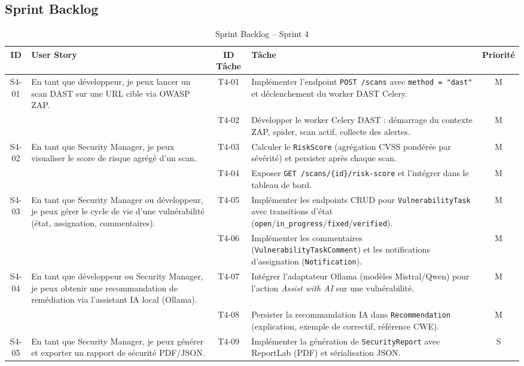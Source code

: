 \subsection{Sprint Backlog}
\begin{table}[H]
\centering
\caption{Sprint Backlog -- Sprint 4}
\label{tab:sprint4-backlog}
\small
\renewcommand{\arraystretch}{1.3}
\begin{tabularx}{\textwidth}{c X c X c}
\hline
\rowcolor{gray!15}
\textbf{ID} & \textbf{User Story} & \textbf{ID Tâche} & \textbf{Tâche} & \textbf{Priorité} \\
\hline
S4-01 & En tant que développeur, je peux lancer un scan DAST sur une URL cible via OWASP ZAP.
  & T4-01 & Implémenter l'endpoint \texttt{POST /scans} avec \texttt{method = "dast"} et déclenchement du worker DAST Celery. & M \\
\cline{3-5}
  & & T4-02 & Développer le worker Celery DAST : démarrage du contexte ZAP, spider, scan actif, collecte des alertes. & M \\
\hline
S4-02 & En tant que Security Manager, je peux visualiser le score de risque agrégé d'un scan.
  & T4-03 & Calculer le \texttt{RiskScore} (agrégation CVSS pondérée par sévérité) et persister après chaque scan. & M \\
\cline{3-5}
  & & T4-04 & Exposer \texttt{GET /scans/\{id\}/risk-score} et l'intégrer dans le tableau de bord. & M \\
\hline
S4-03 & En tant que Security Manager ou développeur, je peux gérer le cycle de vie d'une vulnérabilité (état, assignation, commentaires).
  & T4-05 & Implémenter les endpoints CRUD pour \texttt{VulnerabilityTask} avec transitions d'état (\texttt{open}/\texttt{in\_progress}/\texttt{fixed}/\texttt{verified}). & M \\
\cline{3-5}
  & & T4-06 & Implémenter les commentaires (\texttt{VulnerabilityTaskComment}) et les notifications d'assignation (\texttt{Notification}). & M \\
\hline
S4-04 & En tant que développeur ou Security Manager, je peux obtenir une recommandation de remédiation via l'assistant IA local (Ollama).
  & T4-07 & Intégrer l'adaptateur Ollama (modèles Mistral/Qwen) pour l'action \textit{Assist with AI} sur une vulnérabilité. & M \\
\cline{3-5}
  & & T4-08 & Persister la recommandation IA dans \texttt{Recommendation} (explication, exemple de correctif, référence CWE). & M \\
\hline
S4-05 & En tant que Security Manager, je peux générer et exporter un rapport de sécurité PDF/JSON.
  & T4-09 & Implémenter la génération de \texttt{SecurityReport} avec ReportLab (PDF) et sérialisation JSON. & S \\
\hline
\end{tabularx}
\end{table}

